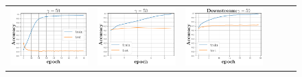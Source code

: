 \begin{figure}[h]
\begin{minipage}{0.99\columnwidth}
{\begin{tabular}{cccccc}
\includegraphics[scale=0.125]{figs/galu_50_bad.pdf}&
\includegraphics[scale=0.125]{figs/galu_50_bad_good.pdf}&
\includegraphics[scale=0.125]{figs/relu_50_good.pdf}&

\end{tabular}}
\end{minipage}
\end{figure}
